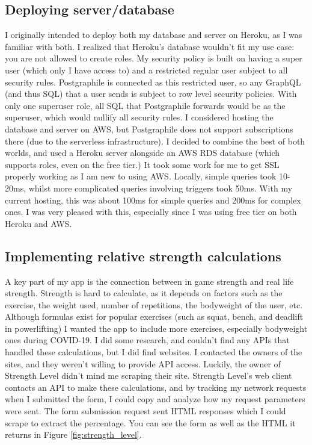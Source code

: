 \documentclass{l4proj}
\begin{document}
\subsection{Deploying server/database}
I originally intended to deploy both my database and server on Heroku, as I was familiar with both. I realized that Heroku's database wouldn't fit my use case: you are not allowed to create roles. My security policy is built on having a super user (which only I have access to) and a restricted regular user subject to all security rules. Postgraphile is connected as this restricted user, so any GraphQL (and thus SQL) that a user sends is subject to row level security policies. With only one superuser role, all SQL that Postgraphile forwards would be as the superuser, which would nullify all security rules. I considered hosting the database and server on AWS, but Postgraphile does not support subscriptions there (due to the serverless infrastructure). I decided to combine the best of both worlds, and used a Heroku server alongside an AWS RDS database (which supports roles, even on the free tier.) It took some work for me to get SSL properly working as I am new to using AWS. Locally, simple queries took 10-20ms, whilst more complicated queries involving triggers took 50ms. With my current hosting, this was about 100ms for simple queries and 200ms for complex ones. I was very pleased with this, especially since I was using free tier on both Heroku and AWS. 

\subsection{Implementing relative strength calculations} \label{strength_calculations}
A key part of my app is the connection between in game strength and real life strength. Strength is hard to calculate, as it depends on factors such as the exercise, the weight used, number of repetitions, the bodyweight of the user, etc. Although formulas exist for popular exercises (such as squat, bench, and deadlift in powerlifting) I wanted the app to include more exercises, especially bodyweight ones during COVID-19. I did some research, and couldn't find any APIs that handled these calculations, but I did find websites. I contacted the owners of the sites, and they weren't willing to provide API access. Luckily, the owner of Strength Level didn't mind me scraping their site. Strength Level's web client contacts an API to make these calculations, and by tracking my network requests when I submitted the form, I could copy and analyze how my request parameters were sent. The form submission request sent HTML responses which I could scrape to extract the percentage. You can see the form as well as the HTML it returns in Figure \ref{fig:strength_level}.
\end{document}
